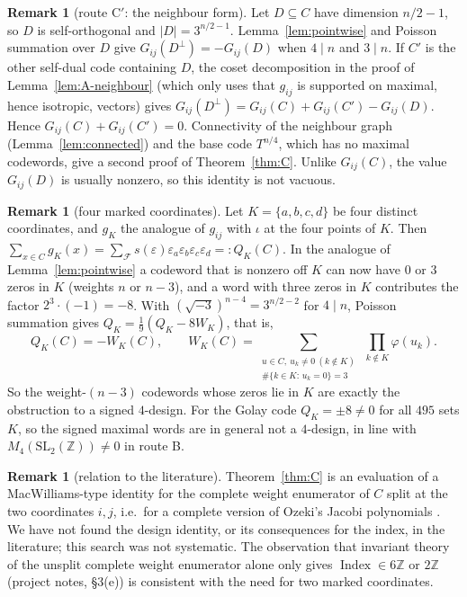 \documentclass[11pt]{amsart}
\theoremstyle{definition}
\newtheorem{remark}[theorem]{Remark}
\newcommand{\Z}{\mathbb{Z}}
\newcommand{\Index}{\operatorname{Index}}
\newcommand{\cF}{\mathcal{F}}
\newcommand{\isq}{\sqrt{-3}}
\begin{document}
\begin{remark}[route C$'$: the neighbour form]\label{rem:Cprime}
Let $D\subseteq C$ have dimension $n/2-1$, so $D$ is self-orthogonal and $|D|=3^{n/2-1}$.
Lemma~\ref{lem:pointwise} and Poisson summation over $D$ give $G_{ij}(D^\perp)=-G_{ij}(D)$ when
$4\mid n$ and $3\mid n$. If $C'$ is the other self-dual code containing $D$, the coset decomposition in
the proof of Lemma~\ref{lem:A-neighbour} (which only uses that $g_{ij}$ is supported on maximal,
hence isotropic, vectors) gives $G_{ij}(D^\perp)=G_{ij}(C)+G_{ij}(C')-G_{ij}(D)$. Hence
$G_{ij}(C)+G_{ij}(C')=0$. Connectivity of the neighbour graph (Lemma~\ref{lem:connected}) and the
base code $T^{n/4}$, which has no maximal codewords, give a second proof of Theorem~\ref{thm:C}.
Unlike $G_{ij}(C)$, the value $G_{ij}(D)$ is usually nonzero, so this identity is not vacuous.
\end{remark}

\begin{remark}[four marked coordinates]\label{rem:four}
Let $K=\{a,b,c,d\}$ be four distinct coordinates, and $g_K$ the analogue of $g_{ij}$ with $\iota$ at
the four points of $K$. Then $\sum_{x\in C}g_K(x)=\sum_{\cF}s(\varepsilon)\varepsilon_a\varepsilon_b
\varepsilon_c\varepsilon_d=:Q_K(C)$. In the analogue of Lemma~\ref{lem:pointwise} a codeword that is
nonzero off $K$ can now have $0$ or $3$ zeros in $K$ (weights $n$ or $n-3$), and a word with three
zeros in $K$ contributes the factor $2^3\cdot(-1)=-8$. With $(\isq)^{n-4}=3^{n/2-2}$ for $4\mid n$,
Poisson summation gives $Q_K=\frac19(Q_K-8W_K)$, that is,
\[
  Q_K(C)=-W_K(C),\qquad W_K(C)=\sum_{\substack{u\in C,\ u_k\ne0\ (k\notin K)\\ \#\{k\in K:\,u_k=0\}=3}}
  \ \prod_{k\notin K}\varphi(u_k).
\]
So the weight-$(n-3)$ codewords whose zeros lie in $K$ are exactly the obstruction to a signed
$4$-design. For the Golay code $Q_K=\pm8\ne0$ for all $495$ sets $K$, so the signed maximal words
are in general not a $4$-design, in line with $M_4(\mathrm{SL}_2(\Z))\ne0$ in route B.
\end{remark}

\begin{remark}[relation to the literature]\label{rem:lit}
Theorem~\ref{thm:C} is an evaluation of a MacWilliams-type identity for the complete weight
enumerator of $C$ split at the two coordinates $i,j$, i.e.\ for a complete version of Ozeki's Jacobi
polynomials \cite{Oz,CM}. We have not found the design identity, or its consequences for the index,
in the literature; this search was not systematic. The observation that invariant theory of the
unsplit complete weight enumerator alone only gives $\Index\in6\Z$ or $2\Z$ (project notes, \S3(e))
is consistent with the need for two marked coordinates.
\end{remark}
\end{document}
